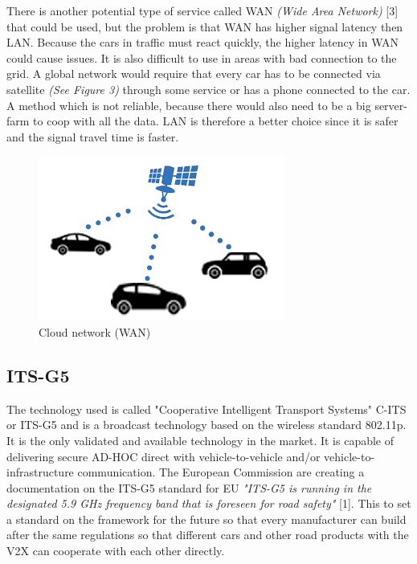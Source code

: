 There is another potential type of service called WAN \textit{(Wide Area Network)} [3] that could be used, but the problem is that WAN has higher signal latency then LAN. Because the cars in traffic must react quickly, the higher latency in WAN could cause issues. It is also difficult to use in areas with bad connection to the grid. A global network would require that every car has to be connected via satellite \textit{(See Figure 3)} through some service or has a phone connected to the car. A method which is not reliable, because there would also need to be a big server-farm to coop with all the data. LAN is therefore a better choice since it is safer and the signal travel time is faster. 

\begin{figure}[H]
    \centering
    \includegraphics[scale=0.8]{images/V2VGlobal.png}
    \caption{Cloud network (WAN)}
\end{figure}

\subsection{ITS-G5}
The technology used is called "Cooperative Intelligent Transport Systems" C-ITS or ITS-G5 and is a broadcast technology based on the wireless standard 802.11p. It is the only validated and available technology in the market. It is capable of delivering secure AD-HOC direct with vehicle-to-vehicle and/or vehicle-to-infrastructure communication. The European Commission are creating a documentation on the ITS-G5 standard for EU \textit{"ITS-G5 is running in the designated 5.9 GHz frequency band that is foreseen for road safety"} [1]. This to set a standard on the framework for the future so that every manufacturer can build after the same regulations so that different cars and other road products with the V2X can cooperate with each other directly. 
